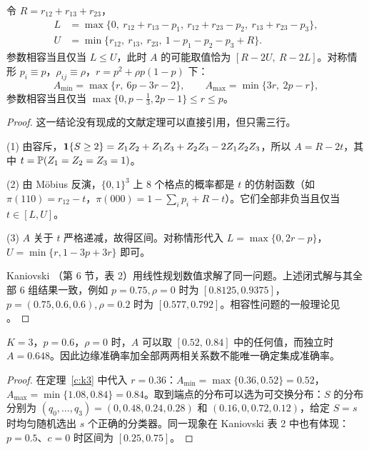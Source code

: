 \documentclass[11pt]{article}
\begin{document}
\begin{theorem}[$K=3$ 的精确区间]\label{c:k3}
令 $R=r_{12}+r_{13}+r_{23}$，
\begin{align*}
L&=\max\{0,\ r_{12}+r_{13}-p_1,\ r_{12}+r_{23}-p_2,\ r_{13}+r_{23}-p_3\},\\
U&=\min\{r_{12},\ r_{13},\ r_{23},\ 1-p_1-p_2-p_3+R\}.
\end{align*}
参数相容当且仅当 $L\le U$，此时 $A$ 的可能取值恰为 $[R-2U,\ R-2L]$。对称情形 $p_i\equiv p$，$\rho_{ij}\equiv\rho$，$r=p^2+\rho p(1-p)$ 下：
\[
A_{\min}=\max\{r,\ 6p-3r-2\},\qquad A_{\max}=\min\{3r,\ 2p-r\},
\]
参数相容当且仅当 $\max\{0,p-\tfrac13,2p-1\}\le r\le p$。
\end{theorem}
\begin{proof}
这一结论没有现成的文献定理可以直接引用，但只需三行。

(1) 由容斥，$\mathbf{1}\{S\ge2\}=Z_1Z_2+Z_1Z_3+Z_2Z_3-2Z_1Z_2Z_3$，所以 $A=R-2t$，其中 $t=\mathbb{P}(Z_1=Z_2=Z_3=1)$。

(2) 由 Möbius 反演，$\{0,1\}^3$ 上 8 个格点的概率都是 $t$ 的仿射函数（如 $\pi(110)=r_{12}-t$，$\pi(000)=1-\sum_ip_i+R-t$）。它们全部非负当且仅当 $t\in[L,U]$。

(3) $A$ 关于 $t$ 严格递减，故得区间。对称情形代入 $L=\max\{0,2r-p\}$，$U=\min\{r,1-3p+3r\}$ 即可。

Kaniovski \cite{kaniovski2010}（第 6 节，表 2）用线性规划数值求解了同一问题。上述闭式解与其全部 6 组结果一致，例如 $p=0.75,\rho=0$ 时为 $[0.8125,0.9375]$，$p=(0.75,0.6,0.6),\rho=0.2$ 时为 $[0.577,0.792]$。相容性问题的一般理论见 \cite{chaganty}。
\end{proof}

\begin{corollary}[两两相关信息不足]\label{c:counter}
$K=3$，$p=0.6$，$\rho=0$ 时，$A$ 可以取 $[0.52,\,0.84]$ 中的任何值，而独立时 $A=0.648$。因此边缘准确率加全部两两相关系数不能唯一确定集成准确率。
\end{corollary}
\begin{proof}
在定理~\ref{c:k3} 中代入 $r=0.36$：$A_{\min}=\max\{0.36,0.52\}=0.52$，$A_{\max}=\min\{1.08,0.84\}=0.84$。取到端点的分布可以选为可交换分布：$S$ 的分布分别为 $(q_0,\dots,q_3)=(0,0.48,0.24,0.28)$ 和 $(0.16,0,0.72,0.12)$，给定 $S=s$ 时均匀随机选出 $s$ 个正确的分类器。同一现象在 Kaniovski \cite{kaniovski2010} 表 2 中也有体现：$p=0.5$、$c=0$ 时区间为 $[0.25,0.75]$。
\end{proof}
\end{document}
